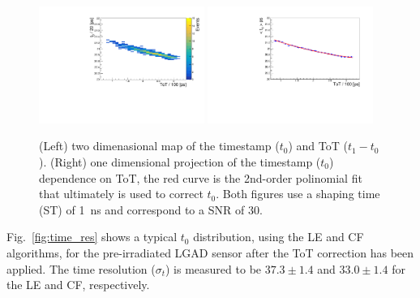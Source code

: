 \documentclass[preprint,1p]{elsarticle}
\begin{document}
\begin{figure}[htbp]
  \centering
  \includegraphics[width=0.48\textwidth]{figs/twoD_ToT_pre_rad_st_1ns_snr_30_le_tot_threshold_30mV_v2.pdf} \hfill
  \includegraphics[width=0.48\textwidth]{figs/oneD_ToT_pre_rad_st_1ns_snr_30_le_tot_threshold_30mV_v2.pdf}
  \caption{(Left) two dimenasional map of the timestamp ($t_{0}$) and ToT ($t_{1} - t_{0}$).
  (Right) one dimensional projection of the timestamp ($t_{0}$) dependence on ToT, the red curve is the 2nd-order polinomial fit that
  ultimately is used to correct $t_{0}$. Both figures use a shaping time (ST) of 1~\si{ns} and correspond to a SNR of 30.}
  \label{fig:ToT}
\end{figure}


Fig.~\ref{fig:time_res} shows a typical $t_{0}$ distribution, using the LE and CF algorithms, for the pre-irradiated
LGAD sensor after the ToT correction has been applied. The time resolution ($\sigma_{t}$) is measured to be $37.3 \pm 1.4 $
and $33.0 \pm 1.4$ for the LE and CF, respectively. 
\end{document}
